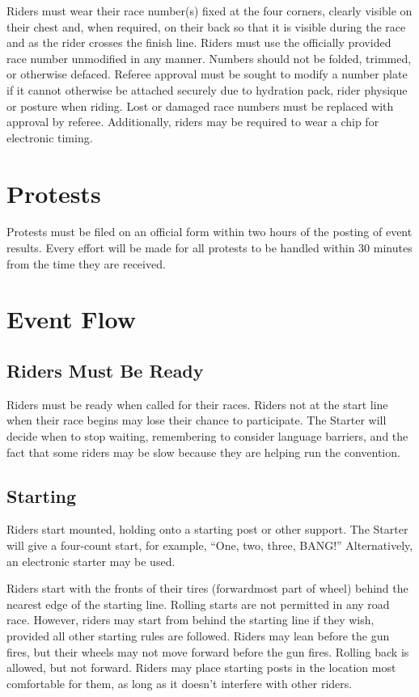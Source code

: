 Riders must wear their race number(s) fixed at the four corners, clearly visible on their chest and, when required, on their back so that it is visible during the race and as the rider crosses the finish line.
Riders must use the officially provided race number unmodified in any manner.
Numbers should not be folded, trimmed, or otherwise defaced.
Referee approval must be sought to modify a number plate if it cannot otherwise be attached securely due to hydration pack, rider physique or posture when riding.
Lost or damaged race numbers must be replaced with approval by referee.
Additionally, riders may be required to wear a chip for electronic timing.

\section{Protests}

Protests must be filed on an official form within two hours of the posting of event results.
Every effort will be made for all protests to be handled within 30 minutes from the time they are received.

\section{Event Flow}

\subsection{Riders Must Be Ready}

Riders must be ready when called for their races.
Riders not at the start line when their race begins may lose their chance to participate.
The Starter will decide when to stop waiting, remembering to consider language barriers, and the fact that some riders may be slow because they are helping run the convention.

\subsection{Starting}

Riders start mounted, holding onto a starting post or other support.
The Starter will give a four-count start, for example, ``One, two, three, BANG!'' Alternatively, an electronic starter may be used.

Riders start with the fronts of their tires (forwardmost part of wheel) behind the nearest edge of the starting line.
Rolling starts are not permitted in any road race.
However, riders may start from behind the starting line if they wish, provided all other starting rules are followed.
Riders may lean before the gun fires, but their wheels may not move forward before the gun fires.
Rolling back is allowed, but not forward.
Riders may place starting posts in the location most comfortable for them, as long as it doesn't interfere with other riders.

